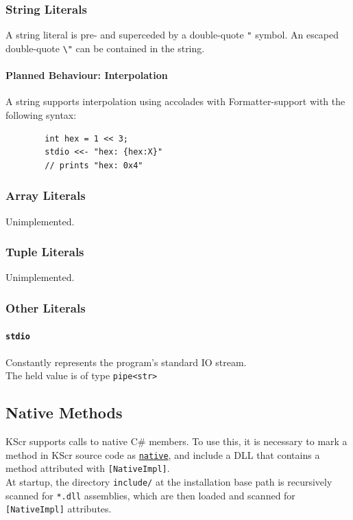\documentclass{docs}
\begin{document}
    \label{litStr}
    \subsubsection{String Literals}
    A string literal is pre- and superceded by a double-quote \texttt{"} symbol.
    An escaped double-quote \texttt{\textbackslash"} can be contained in the string.
    
    \paragraph{Planned Behaviour: Interpolation}
    A string supports interpolation using accolades with Formatter-support with the following syntax:
    \begin{verbatim}
        int hex = 1 << 3;
        stdio <<- "hex: {hex:X}"
        // prints "hex: 0x4"
    \end{verbatim}
    
    \label{litArray}
    \subsubsection{Array Literals}
    Unimplemented.
    
    \label{litTuple}
    \subsubsection{Tuple Literals}
    Unimplemented.
    
    \subsubsection{Other Literals}
    
    \label{litStdio}
    \paragraph{\texttt{stdio}}
    Constantly represents the program's standard IO stream. \\
    The held value is of type \texttt{pipe<str>}

    \subsection{Native Methods}
    KScr supports calls to native C\# members.
    To use this, it is necessary to mark a method in KScr source code as \hyperref[modNative]{\texttt{native}}, and include a DLL that contains a method attributed with \texttt{[NativeImpl]}.
    \\
    At startup, the directory \texttt{include/} at the installation base path is recursively scanned for \texttt{*.dll} assemblies, which are then loaded and scanned for \texttt{[NativeImpl]} attributes.
\end{document}
